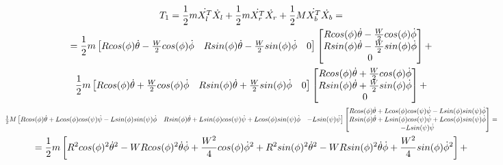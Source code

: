 \documentclass[10pt]{article}
\begin{document}
\begin{equation}
\begin{gathered}
    T_1 = \frac{1}{2}m \dot{X_l^T} \dot{X_l} +
    \frac{1}{2}m \dot{X_r^T} \dot{X_r} +
    \frac{1}{2}M \dot{X_b^T} \dot{X_b} = \\
    = \frac{1}{2}m
    \begin{bmatrix}
        R cos(\phi) \dot{\theta} - \frac{W}{2}cos(\phi)\dot{\phi}
        & R sin(\phi) \dot{\theta} - \frac{W}{2}sin(\phi)\dot{\phi}
        & 0
    \end{bmatrix}
    \begin{bmatrix}
        R cos(\phi) \dot{\theta} - \frac{W}{2}cos(\phi)\dot{\phi} \\
        R sin(\phi) \dot{\theta} - \frac{W}{2}sin(\phi)\dot{\phi} \\
        0
    \end{bmatrix} + \\
    \frac{1}{2}m
    \begin{bmatrix}
        R cos(\phi) \dot{\theta} + \frac{W}{2}cos(\phi)\dot{\phi}
        & R sin(\phi) \dot{\theta} + \frac{W}{2}sin(\phi)\dot{\phi}
        & 0
    \end{bmatrix}
    \begin{bmatrix}
        R cos(\phi) \dot{\theta} + \frac{W}{2}cos(\phi)\dot{\phi} \\
        R sin(\phi) \dot{\theta} + \frac{W}{2}sin(\phi)\dot{\phi} \\
        0
    \end{bmatrix} + \\
    \scalebox{0.7}{$
    \frac{1}{2}M
    \begin{bmatrix}
        R cos(\phi) \dot{\theta} + L cos(\phi)cos(\psi)\dot{\psi} - L sin(\phi)sin(\psi)\dot{\phi}
        & R sin(\phi) \dot{\theta} + L sin(\phi)cos(\psi)\dot{\psi} + L cos(\phi)sin(\psi)\dot{\phi}
        & -L sin(\psi) \dot{\psi}
    \end{bmatrix}
    \begin{bmatrix}
        R cos(\phi) \dot{\theta} + L cos(\phi)cos(\psi)\dot{\psi} - L sin(\phi)sin(\psi)\dot{\phi}
        \\ R sin(\phi) \dot{\theta} + L sin(\phi)cos(\psi)\dot{\psi} + L cos(\phi)sin(\psi)\dot{\phi}
        \\ -L sin(\psi) \dot{\psi}
    \end{bmatrix} =
    $} \\
    = \frac{1}{2}m \left[R^2cos(\phi)^2\dot{\theta}^2 - WR cos(\phi)^2\dot{\theta}\dot{\phi} + \frac{W^2}{4}cos(\phi)\dot{\phi}^2 + R^2sin(\phi)^2\dot{\theta}^2 - WR sin(\phi)^2\dot{\theta}\dot{\phi} + \frac{W^2}{4}sin(\phi)\dot{\phi}^2\right] + \\

\end{gathered}
\end{equation}
\end{document}
